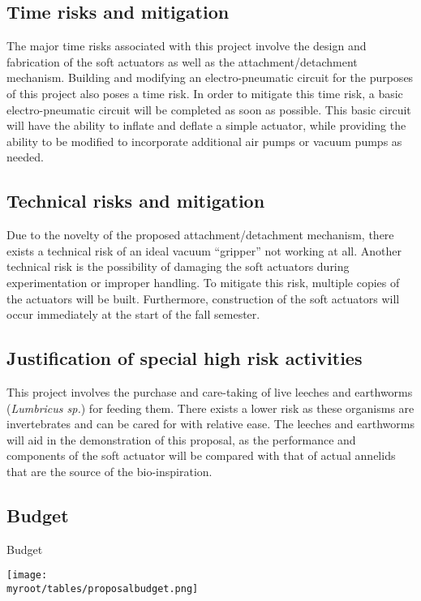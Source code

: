 \documentclass{IEEEtran}
\newcommand{\myroot}{../}
\begin{document}
\subsection{Time risks and mitigation}
The major time risks associated with this project involve the design and fabrication of the soft actuators as well as the attachment/detachment mechanism.  Building and modifying an electro-pneumatic circuit for the purposes of this project also poses a time risk.  In order to mitigate this time risk, a basic electro-pneumatic circuit will be completed as soon as possible.  This basic circuit will have the ability to inflate and deflate a simple actuator, while providing the ability to be modified to incorporate additional air pumps or vacuum pumps as needed.

\subsection{Technical risks and mitigation}
Due to the novelty of the proposed attachment/detachment mechanism, there exists a technical risk of an ideal vacuum ``gripper'' not working at all.  Another technical risk is the possibility of damaging the soft actuators during experimentation or improper handling.  To mitigate this risk, multiple copies of the actuators will be built.  Furthermore, construction of the soft actuators will occur immediately at the start of the fall semester.

\subsection{Justification of special high risk activities}
This project involves the purchase and care-taking of live leeches and earthworms (\emph{Lumbricus sp.}) for feeding them.  There exists a lower risk as these organisms are invertebrates and can be cared for with relative ease.  The leeches and earthworms will aid in the demonstration of this proposal, as the performance and components of the soft actuator will be compared with that of actual annelids that are the source of the bio-inspiration. 

\subsection{Budget}
\begin{table}
\caption{Budget}
\label{tbudget}
\begin{center}
\texttt{[image: \\myroot/tables/proposalbudget.png]}
\end{center}
\end{table}
\end{document}
